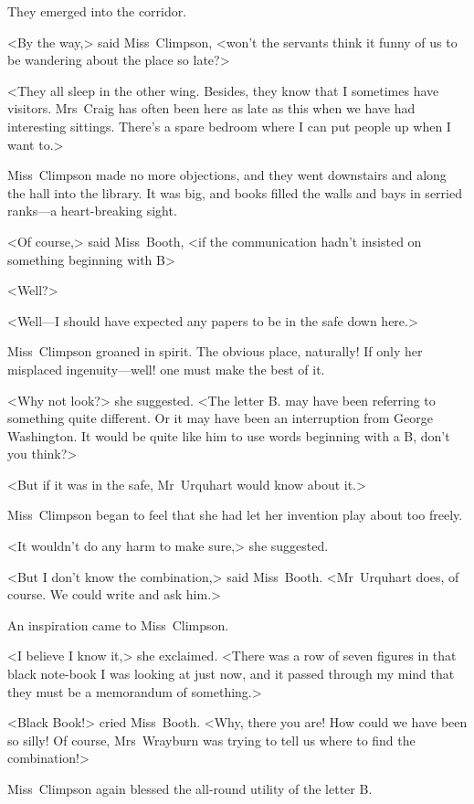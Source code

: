 They emerged into the corridor.

<By the way,> said Miss~Climpson, <won't the servants think it funny of us to be wandering about the place so late?>

<They all sleep in the other wing. Besides, they know that I sometimes have visitors. Mrs~Craig has often been here as late as this when we have had interesting sittings. There's a spare bedroom where I can put people up when I want to.>

Miss~Climpson made no more objections, and they went downstairs and along the hall into the library. It was big, and books filled the walls and bays in serried ranks—a heart-breaking sight.

<Of course,> said Miss~Booth, <if the communication hadn't insisted on something beginning with B\longdash>

<Well?>

<Well—I should have expected any papers to be in the safe down here.>

Miss~Climpson groaned in spirit. The obvious place, naturally! If only her misplaced ingenuity—well! one must make the best of it.

<Why not look?> she suggested. <The letter B. may have been referring to something quite different. Or it may have been an interruption from George Washington. It would be quite like him to use words beginning with a B, don't you think?>

<But if it was in the safe, Mr~Urquhart would know about it.>

Miss~Climpson began to feel that she had let her invention play about too freely.

<It wouldn't do any harm to make sure,> she suggested.

<But I don't know the combination,> said Miss~Booth. <Mr~Urquhart does, of course. We could write and ask him.>

An inspiration came to Miss~Climpson.

<I believe I know it,> she exclaimed. <There was a row of seven figures in that black note-book I was looking at just now, and it passed through my mind that they must be a memorandum of something.>

<Black Book!> cried Miss~Booth. <Why, there you are! How could we have been so silly! Of course, Mrs~Wrayburn was trying to tell us where to find the combination!>

Miss~Climpson again blessed the all-round utility of the letter B\@.

